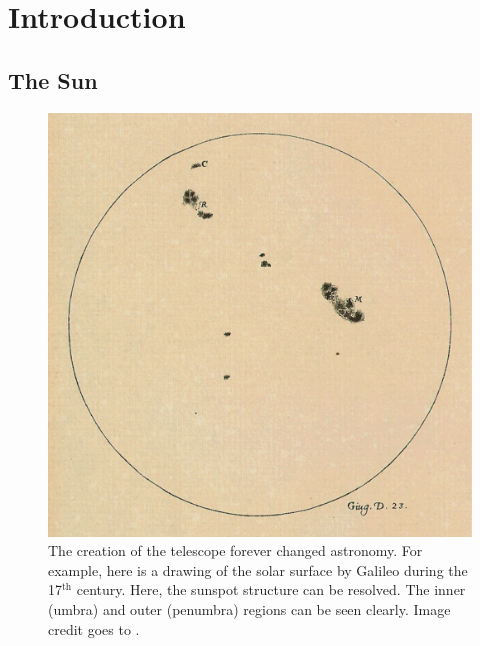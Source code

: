 \graphicspath{{Chapter1/Figs/}}

\chapter{Introduction}
\label{chapter1}
      	
   \vspace*{\fill}\par
   \pagebreak

\section{The Sun}

    \begin{figure}
        \centering
        \includegraphics[width=\textwidth]{23_June_1613.pdf}
        \caption{
                 The creation of the telescope forever changed astronomy.
                 For example, here is a drawing of the solar surface by Galileo during the 17$^{\mathrm{th}}$ century. 
                 Here, the sunspot structure can be resolved.
                 The inner (umbra) and outer (penumbra) regions can be seen clearly.
                 Image credit goes to \cite{galileo}.
               }
        \label{fig:galileo}
    \end{figure}
     
